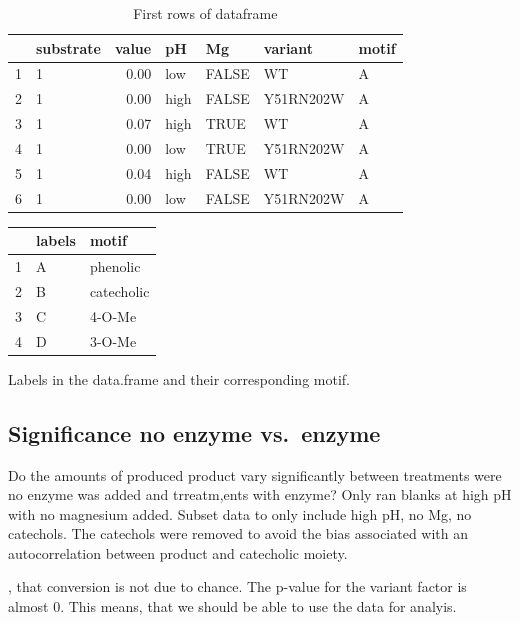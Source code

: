 \documentclass[]{tufte-handout}
\begin{document}
\begin{table}[ht]
\centering
\begin{tabular}{rlrllll}
  \toprule
 & substrate & value & pH & Mg & variant & motif \\ 
  \midrule
1 & 1 & 0.00 & low & FALSE & WT & A \\ 
  2 & 1 & 0.00 & high & FALSE & Y51RN202W & A \\ 
  3 & 1 & 0.07 & high & TRUE & WT & A \\ 
  4 & 1 & 0.00 & low & TRUE & Y51RN202W & A \\ 
  5 & 1 & 0.04 & high & FALSE & WT & A \\ 
  6 & 1 & 0.00 & low & FALSE & Y51RN202W & A \\ 
   \bottomrule
\end{tabular}
\caption{First rows of dataframe} 
\end{table}

\begin{margintable}
\centering
\begin{tabular}{rll}
  \toprule
 & labels & motif \\ 
  \midrule
1 & A & phenolic \\ 
  2 & B & catecholic \\ 
  3 & C & 4-O-Me \\ 
  4 & D & 3-O-Me \\ 
   \bottomrule
\end{tabular}
\caption{Labels in the data.frame and their corresponding motif.} 
\end{margintable}

\subsection{Significance no enzyme
vs.~enzyme}\label{significance-no-enzyme-vs.enzyme}

Do the amounts of produced product vary significantly between treatments
were no enzyme was added and trreatm,ents with enzyme? Only ran blanks
at high pH with no magnesium added. Subset data to only include high pH,
no Mg, no catechols. The catechols were removed to avoid the bias
associated with an autocorrelation between product and catecholic
moiety.

, that conversion is not
due to chance. The p-value for the variant factor is almost 0. This
means, that we should be able to use the data for analyis.
\end{document}
